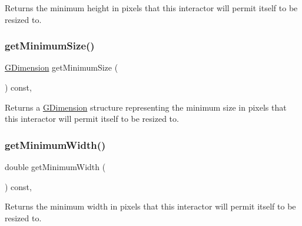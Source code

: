 Returns the minimum height in pixels that this interactor will permit itself to be resized to. 

\mbox{\label{classsgl_1_1GInteractor_a66b5af0b32493b4d597ca0a3df2049ea}} 
\subsubsection{\texorpdfstring{get\+Minimum\+Size()}{getMinimumSize()}}
{\footnotesize\ttfamily \mbox{\hyperlink{structsgl_1_1GDimension}{G\+Dimension}} get\+Minimum\+Size (\begin{DoxyParamCaption}{ }\end{DoxyParamCaption}) const\hspace{0.3cm}{\ttfamily [virtual]}, {\ttfamily [inherited]}}



Returns a \mbox{\hyperlink{structsgl_1_1GDimension}{G\+Dimension}} structure representing the minimum size in pixels that this interactor will permit itself to be resized to. 

\mbox{\label{classsgl_1_1GInteractor_a59e668114fe3d49d2a0f28deb258f7c8}} 
\subsubsection{\texorpdfstring{get\+Minimum\+Width()}{getMinimumWidth()}}
{\footnotesize\ttfamily double get\+Minimum\+Width (\begin{DoxyParamCaption}{ }\end{DoxyParamCaption}) const\hspace{0.3cm}{\ttfamily [virtual]}, {\ttfamily [inherited]}}



Returns the minimum width in pixels that this interactor will permit itself to be resized to. 

\mbox{\label{classsgl_1_1GInteractor_a8a60438a5b55d0b2ceb35c8674b9d8c5}} 
